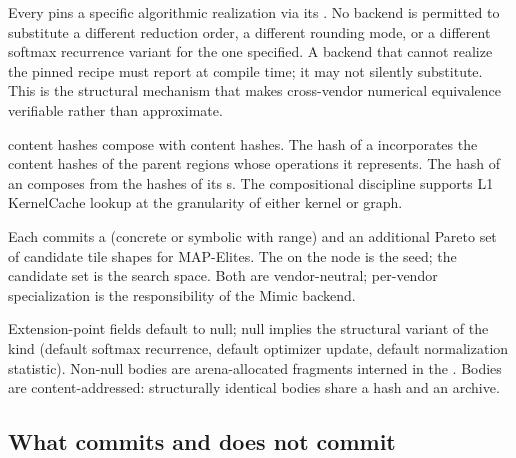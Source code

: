 \begin{property}
\label{prop:ir002-pinned}
Every  pins a specific algorithmic realization via its .
No backend is permitted to substitute a different reduction order, a different rounding mode, or a different softmax recurrence variant for the one specified.
A backend that cannot realize the pinned recipe must report  at compile time; it may not silently substitute.
This is the structural mechanism that makes cross-vendor numerical equivalence verifiable rather than approximate.
\end{property}

\begin{property}
\label{prop:ir002-compositional}
 content hashes compose with  content hashes.
The hash of a  incorporates the content hashes of the parent  regions whose operations it represents.
The hash of an   composes from the hashes of its s.
The compositional discipline supports L1 KernelCache lookup at the granularity of either kernel or graph.
\end{property}

\begin{property}
\label{prop:ir002-pareto}
Each  commits a  (concrete or symbolic with range) and an additional Pareto set of candidate tile shapes for MAP-Elites.
The  on the node is the seed; the candidate set is the search space.
Both are vendor-neutral; per-vendor specialization is the responsibility of the Mimic backend.
\end{property}

\begin{property}
\label{prop:ir002-extension}
Extension-point fields default to null; null implies the structural variant of the kind (default softmax recurrence, default optimizer update, default normalization statistic).
Non-null bodies are arena-allocated   fragments interned in the  .
Bodies are content-addressed: structurally identical bodies share a hash and an archive.
\end{property}

\subsection{What  commits and does not commit}
\label{sec:ir002-not}

